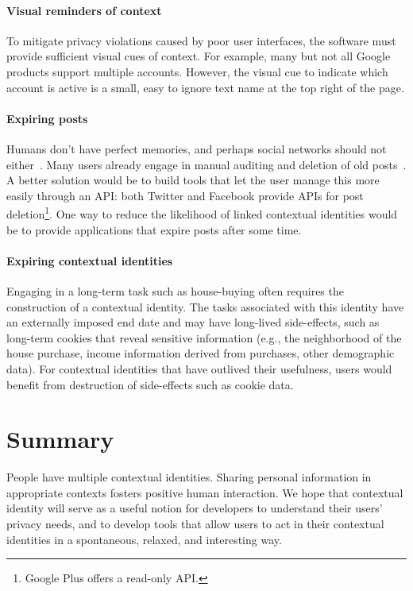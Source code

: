 \documentclass[10pt, conference, compsocconf]{IEEEtran}
\begin{document}
\paragraph{Visual reminders of context}
To mitigate privacy violations caused by poor user interfaces, the software
must provide sufficient visual cues of context. For example, many but not all
Google products support multiple accounts. However, the visual cue to indicate
which account is active is a small, easy to ignore text name at the top right
of the page.

\paragraph{Expiring posts}
Humans don't have perfect memories, and perhaps social networks should not
either~\cite{delete}. Many users already engage in manual auditing and deletion
of old posts~\cite{fbtips2}. A better solution would be to build tools that let
the user manage this more easily through an API: both Twitter and Facebook
provide APIs for post deletion\footnote{Google Plus
offers a read-only API.}. One way to reduce the likelihood of linked contextual
identities would be to provide applications that expire posts after some time.

\paragraph{Expiring contextual identities}
Engaging in a long-term task such as house-buying
often requires the construction of a contextual identity. The tasks associated
with this identity have an externally imposed end date and may have long-lived
side-effects, such as long-term cookies that reveal sensitive information
(e.g., the neighborhood of the house purchase, income information derived from
purchases, other demographic data). For contextual identities that have
outlived their usefulness, users would benefit from destruction of side-effects
such as cookie data.

\section{Summary}
People have multiple contextual identities. Sharing personal information in
appropriate contexts fosters positive human interaction.  We hope that
contextual identity will serve as a useful notion for developers to understand
their users' privacy needs, and to develop tools that allow users to act in
their contextual identities in a spontaneous, relaxed, and interesting way.

\begin{comment}
\section{Acknowledgements}
The authors thank
Lucas Adamski
Ben Adida
Mike Connor
Chris Karlof
\end{comment}



\end{document}
